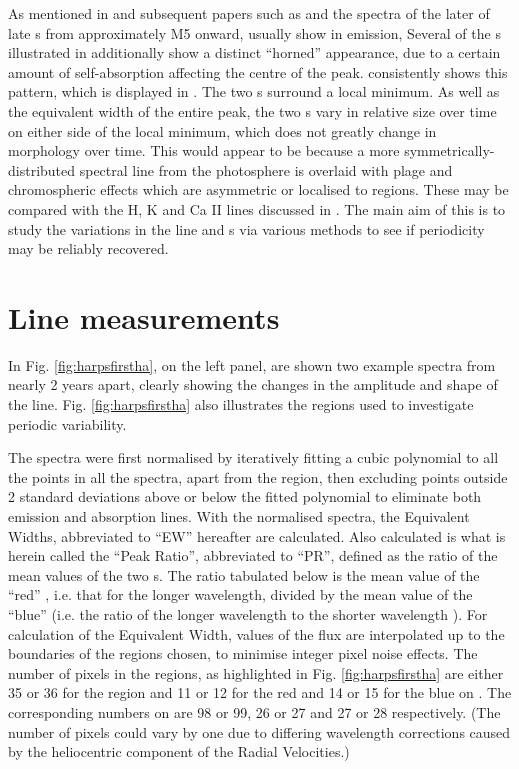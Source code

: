 As mentioned in \citet{mohanty03} and subsequent papers such as \citet{jenkins09} and \citet{barnes14} the spectra of
the later of late \rdwarf s from approximately M5 onward, usually show {\ha} in emission, Several of the \rdwarf s
illustrated in \citet[Fig. 6]{barnes14} additionally show a distinct ``horned'' appearance, due to a certain amount of
self-absorption affecting the centre of the {\ha} peak. {\prox} consistently shows this pattern, which is displayed in
\citet[fig. 14]{fuhrmeister11}. The two \horn s surround a local minimum. As well as the equivalent width of the entire
{\ha} peak, the two \horn s vary in relative size over time on either side of the local minimum, which does not greatly
change in morphology over time. This would appear to be because a more symmetrically-distributed spectral line from the
photosphere is overlaid with plage and chromospheric effects which are asymmetric or localised to regions. These may be
compared with the H, K and Ca II lines discussed in \citet{rauscher06}. The main aim of this {\paperorthesis} is to
study the variations in the line and \horn s via various methods to see if periodicity may be reliably recovered.

\section{{\ha} Line measurements}
\protect\label{section:linemeas}

In Fig. \ref{fig:harpsfirstha}, on the left panel, are shown two example spectra from {\harps} nearly 2 years apart,
clearly showing the changes in the amplitude and shape of the {\ha} line. Fig. \ref{fig:harpsfirstha} also illustrates
the regions used to investigate periodic variability.

The spectra were first normalised by iteratively fitting a cubic polynomial to all the points in all the spectra, apart
from the {\ha} region, then excluding points outside 2 standard deviations above or below the fitted polynomial to
eliminate both emission and absorption lines. With the normalised spectra, the Equivalent Widths, abbreviated to ``EW''
hereafter are calculated. Also calculated is what is herein called the ``Peak Ratio'', abbreviated to ``PR'', defined as
the ratio of the mean values of the two \horn s. The ratio tabulated below is the mean value of the ``red'' \horn, i.e. that
for the longer wavelength, divided by the mean value of the ``blue'' {\horn} (i.e. the ratio of the longer wavelength to
the shorter wavelength \horn). For calculation of the Equivalent Width, values of the flux are interpolated up to the
boundaries of the regions chosen, to minimise integer pixel noise effects. The number of pixels in the regions, as
highlighted in Fig. \ref{fig:harpsfirstha} are either 35 or 36 for the {\ha} region and 11 or 12 for the red {\horn} and
14 or 15 for the blue {\horn} on {\uves}. The corresponding numbers on {\harps} are 98 or 99, 26 or 27 and 27 or 28
respectively. (The number of pixels could vary by one due to differing wavelength corrections caused by the heliocentric
component of the Radial Velocities.)

